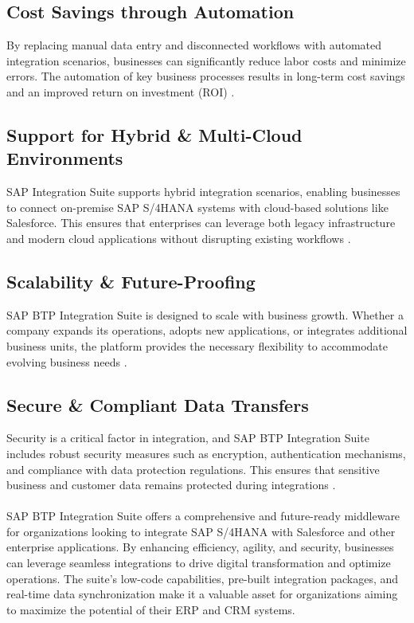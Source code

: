 \subsection{Cost Savings through Automation}
By replacing manual data entry and disconnected workflows with automated integration scenarios, businesses can significantly reduce labor costs and minimize errors. The automation of key business processes results in long-term cost savings and an improved return on investment (ROI) \cite{bagga2023introduction}.

\subsection{Support for Hybrid \& Multi-Cloud Environments}
SAP Integration Suite supports hybrid integration scenarios, enabling businesses to connect on-premise SAP S/4HANA systems with cloud-based solutions like Salesforce. This ensures that enterprises can leverage both legacy infrastructure and modern cloud applications without disrupting existing workflows \cite{bagga2023practical}.

\subsection{Scalability \& Future-Proofing}
SAP BTP Integration Suite is designed to scale with business growth. Whether a company expands its operations, adopts new applications, or integrates additional business units, the platform provides the necessary flexibility to accommodate evolving business needs \cite{bagga2023practical}.

\subsection{Secure \& Compliant Data Transfers}
Security is a critical factor in integration, and SAP BTP Integration Suite includes robust security measures such as encryption, authentication mechanisms, and compliance with data protection regulations. This ensures that sensitive business and customer data remains protected during integrations \cite{bagga2023practical}.

\paragraph{}
SAP BTP Integration Suite offers a comprehensive and future-ready middleware for organizations looking to integrate SAP S/4HANA with Salesforce and other enterprise applications. By enhancing efficiency, agility, and security, businesses can leverage seamless integrations to drive digital transformation and optimize operations. The suite’s low-code capabilities, pre-built integration packages, and real-time data synchronization make it a valuable asset for organizations aiming to maximize the potential of their ERP and CRM systems.

\newpage